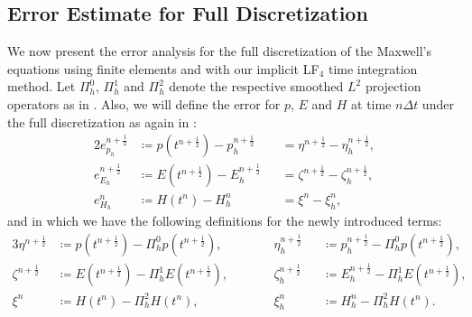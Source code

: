 \documentclass{amsart}
\theoremstyle{thmstyleone}%
\theoremstyle{thmstyletwo}%
\theoremstyle{thmstylethree}%
\begin{document}
\subsection{Error Estimate for Full Discretization}

We now present the error analysis for the full discretization of the Maxwell's equations using finite elements and with our implicit LF$_4$ time integration method.
Let $\Pi_h^0$, $\Pi_h^1$ and $\Pi_h^2$ denote the respective smoothed $L^2$ projection operators as in \cite{ArKa2024}. Also, we will define the error for $p$, $E$ and $H$ at time $n \Delta t$ under the full discretization as again in \cite{ArKa2024}:
\begin{alignat}{2}
  e_{p_h}^{n + \frac{1}{2}} &\coloneq p(t^{n + \frac{1}{2}}) - p_h^{n + \frac{1}{2}} &&= \eta^{n+\frac{1}{2}} - \eta_h^{n+\frac{1}{2}}, \label{eqn:p_fullerror} \\
  e_{E_h}^{n + \frac{1}{2}} &\coloneq E(t^{n + \frac{1}{2}}) - E_h^{n + \frac{1}{2}} &&= \zeta^{n + \frac{1}{2}} - \zeta_h^{n + \frac{1}{2}}, \label{eqn:E_fullerror} \\
  e_{H_h}^n &\coloneq H(t^n) - H_h^n &&= \xi^n - \xi_h^n, \label{eqn:H_fullerror}
\end{alignat}
and in which we have the following definitions for the newly introduced terms:
\begin{alignat}{3}
  \eta^{n + \frac{1}{2}} &\coloneq p(t^{n + \frac{1}{2}}) - \Pi_h^0 p(t^{n + \frac{1}{2}}), &&\qquad \eta_h^{n + \frac{1}{2}} &&\coloneq p_h^{n + \frac{1}{2}}  - \Pi_h^0 p(t^{n + \frac{1}{2}}), \label{eqn:p_fullerror_sub} \\
  \zeta^{n + \frac{1}{2}} &\coloneq E(t^{n + \frac{1}{2}}) - \Pi_h^1 E(t^{n + \frac{1}{2}}), &&\qquad \zeta_h^{n + \frac{1}{2}} &&\coloneq E_h^{n + \frac{1}{2}} - \Pi_h^1 E(t^{n + \frac{1}{2}}), \label{eqn:E_fullerror_sub} \\
  \xi^n &\coloneq H(t^n) - \Pi_h^2 H(t^n), &&\qquad \xi_h^n &&\coloneq H_h^n - \Pi_h^2 H(t^n). \label{eqn:H_fullerror_sub}
\end{alignat}
\end{document}

